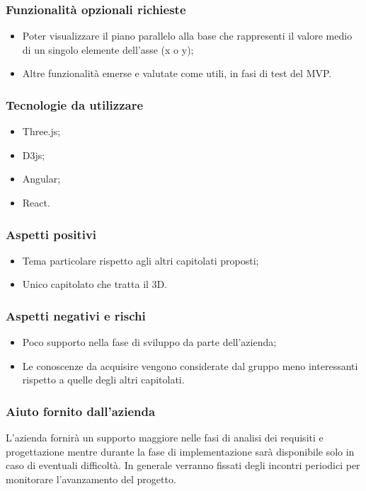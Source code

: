 \documentclass[10pt]{article}
\begin{document}
\subsubsection{Funzionalità opzionali richieste}
\begin{itemize}
    \item Poter visualizzare il piano parallelo alla base che rappresenti il valore medio di un singolo elemente dell’asse (x o y);
    \item Altre funzionalità emerse e valutate come utili, in fasi di test del MVP.
\end{itemize}
\subsubsection{Tecnologie da utilizzare}
\begin{itemize}
    \item Three.js;
    \item D3js;
    \item Angular;
    \item React.
\end{itemize}
\subsubsection{Aspetti positivi}
\begin{itemize}
    \item Tema particolare rispetto agli altri capitolati proposti;
    \item Unico capitolato che tratta il 3D.
\end{itemize}
\subsubsection{Aspetti negativi e rischi}
\begin{itemize}
    \item Poco supporto nella fase di sviluppo da parte dell’azienda;
    \item Le conoscenze da acquisire vengono considerate dal gruppo meno interessanti rispetto a quelle degli altri capitolati.
\end{itemize}
\subsubsection{Aiuto fornito dall'azienda}
L'azienda fornirà un supporto maggiore nelle fasi di analisi dei requisiti e progettazione mentre durante la fase di implementazione sarà disponibile solo in caso di eventuali difficoltà. In generale verranno fissati degli incontri periodici per monitorare l'avanzamento del progetto.
\end{document}
